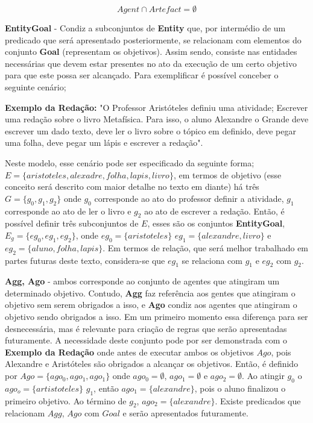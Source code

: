 \begin{equation} \label{agentsartefactvoid}
    Agent \cap Artefact = \emptyset
\end{equation}


\textbf{EntityGoal} - Condiz a subconjuntos de \textbf{Entity} que, por intermédio de um predicado que será apresentado posteriormente, se relacionam com elementos do conjunto \textbf{Goal} (representam os objetivos). Assim sendo, consiste nas entidades necessárias que devem estar presentes no ato da execução de um certo objetivo para que este possa ser alcançado. Para exemplificar é possível conceber o seguinte cenário; 

\textbf{Exemplo da Redação:} "O Professor Aristóteles definiu uma atividade; Escrever uma redação sobre o livro Metafísica. Para isso, o aluno Alexandre o Grande deve escrever um dado texto, deve ler o livro sobre o tópico em definido, deve pegar uma folha, deve pegar um lápis e escrever a redação".  


Neste modelo, esse cenário pode ser especificado da seguinte forma; $E = \{aristoteles, alexadre, folha, lapis, livro\}$, em termos de objetivo (esse conceito será descrito com maior detalhe no texto em diante) há três $G = \{ g_0, g_1,g_2\}$  onde $g_0$ corresponde ao ato do professor definir a atividade, $g_1$ corresponde ao ato de ler o livro e $g_2$ ao ato de escrever a redação. Então, é possível 
definir três subconjuntos de $E$, esses são os conjuntos \textbf{EntityGoal}, $E_g = \{ eg_{0}, eg_{1}, eg_{2} \}$, onde $eg_{0} = \{ aristoteles \}$ $eg_{1} = \{ alexandre, livro\}$ e $eg_{2} = \{ aluno, folha, lapis \}$. Em termos de relação, que será melhor trabalhado 
em partes futuras deste texto, considera-se que $eg_1$ se relaciona com $g_1$ e $eg_2$ com $g_2$.

\textbf{Agg, Ago} - ambos corresponde ao conjunto de agentes que atingiram um determinado objetivo. Contudo, \textbf{Agg} faz referência aos gentes que atingiram o objetivo sem serem obrigados a isso, e \textbf{Ago} condiz aos agentes que atingiram o objetivo sendo obrigados a isso. Em um primeiro momento essa diferença para ser desnecessária, mas é relevante para criação de regras que serão apresentadas futuramente. A necessidade deste conjunto pode por ser demonstrada com o \textbf{Exemplo da Redação} onde antes de executar ambos os objetivos $Ago$, pois Alexandre e Aristóteles são obrigados a alcançar os objetivos. Então, é definido por $Ago = \{ ago_0, ago_1, ago_1 \}$ onde $ago_0 = \emptyset$, $ago_1 = \emptyset$ e $ago_2 = \emptyset$. Ao atingir $g_0$ o $ago_o = \{ artistoteles\}$ $g_1$, então $ago_1 = \{ alexandre \}$, pois o aluno finalizou o primeiro objetivo. Ao término de $g_2$, $ago_2 = \{ alexandre \}$. Existe predicados que relacionam $Agg$, $Ago$ com $Goal$ e serão apresentados futuramente.


